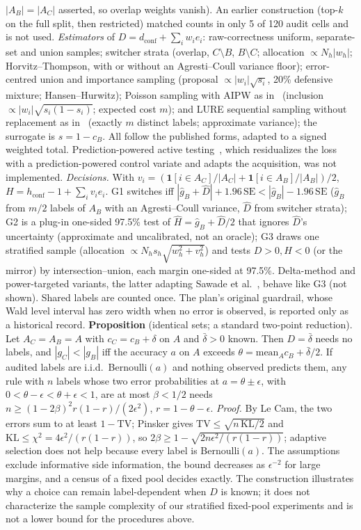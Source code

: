 \documentclass[sigconf,anonymous,review]{acmart}
\begin{document}
$|A_B|=|A_C|$ asserted, so overlap weights vanish). An earlier
construction (top-$k$ on the full split, then restricted) matched counts
in only 5 of 120 audit cells and is not used.
\emph{Estimators} of $D=d_{\text{conf}}+\sum_iw_ie_i$: raw-correctness
uniform, separate-set and union samples; switcher strata (overlap,
$C\setminus B$, $B\setminus C$; allocation $\propto N_h|w_h|$;
Horvitz--Thompson, with or without an Agresti--Coull variance floor);
error-centred union and importance sampling (proposal
$\propto|w_i|\sqrt{s_i}$, 20\% defensive mixture; Hansen--Hurwitz); Poisson
sampling with AIPW as in~\cite{zrnic2024active} (inclusion
$\propto|w_i|\sqrt{s_i(1-s_i)}$; expected cost $m$); and LURE sequential
sampling without replacement as in~\cite{kossen2021active} (exactly $m$
distinct labels; approximate variance); the surrogate is $s=1-c_B$. All follow the published forms, adapted to a signed weighted total. Prediction-powered active
testing~\cite{ashouritaklimi2026ppat}, which residualizes the loss with a
prediction-powered control variate and adapts the acquisition, was not
implemented. \emph{Decisions.} With
$v_i=(\mathbf1[i\in A_C]/|A_C|+\mathbf1[i\in A_B]/|A_B|)/2$,
$H=h_{\text{conf}}-1+\sum_iv_ie_i$. G1 switches iff
$|\hat g_B+\hat D|+1.96\,\mathrm{SE}<|\hat g_B|-1.96\,\mathrm{SE}$ ($\hat
g_B$ from $m/2$ labels of $A_B$ with an Agresti--Coull variance, $\hat D$
from switcher strata); G2 is a plug-in one-sided 97.5\% test of $\hat
H=\hat g_B+\hat D/2$ that ignores $\hat D$'s uncertainty (approximate and
uncalibrated, not an oracle); G3 draws one stratified sample (allocation
$\propto N_hs_h\sqrt{w_h^2+v_h^2}$) and tests $D>0,H<0$ (or the mirror) by
intersection--union, each margin one-sided at 97.5\%. Delta-method and
power-targeted variants, the latter adapting Sawade et
al.~\cite{sawade2012active}, behave like G3 (not shown). Shared labels are
counted once. The plan's original guardrail, whose Wald level interval
has zero width when no error is observed, is reported only as a historical record.
\textbf{Proposition} (identical sets; a standard two-point reduction).
Let $A_C=A_B=A$ with $c_C=c_B+\delta$ on $A$ and $\bar\delta>0$ known.
Then $D=\bar\delta$ needs no labels, and $|g_C|<|g_B|$ iff the accuracy
$a$ on $A$ exceeds $\theta=\mathrm{mean}_Ac_B+\bar\delta/2$. If audited
labels are i.i.d.\ Bernoulli$(a)$ and nothing observed predicts them, any rule with $n$ labels whose two error probabilities at
$a=\theta\pm\epsilon$, with $0<\theta-\epsilon<\theta+\epsilon<1$, are at
most $\beta<1/2$ needs $n\ge(1-2\beta)^2r(1-r)/(2\epsilon^2)$,
$r=1-\theta-\epsilon$. \emph{Proof.} By Le Cam, the two errors sum to at
least $1-\mathrm{TV}$; Pinsker gives $\mathrm{TV}\le\sqrt{n\,\mathrm{KL}/2}$
and $\mathrm{KL}\le\chi^2=4\epsilon^2/(r(1-r))$, so
$2\beta\ge1-\sqrt{2n\epsilon^2/(r(1-r))}$; adaptive selection does not
help because every label is Bernoulli$(a)$. The assumptions exclude informative side information, the bound
decreases as $\epsilon^{-2}$ for large margins, and a census of a fixed
pool decides exactly. The construction illustrates why a choice can
remain label-dependent when $D$ is known; it does not characterize the
sample complexity of our stratified fixed-pool experiments and is not a
lower bound for the procedures above.
\end{document}

